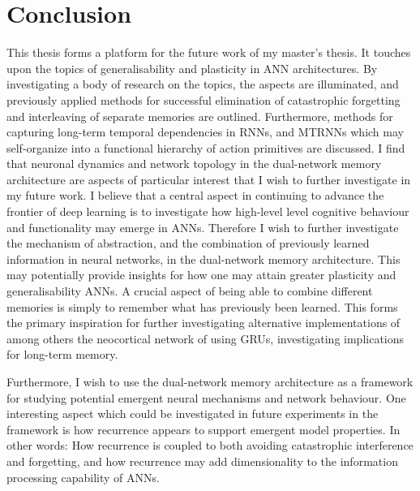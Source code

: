 \section{Conclusion}

This thesis forms a platform for the future work of my master's thesis. It touches upon the topics of generalisability and plasticity in ANN architectures. By investigating a body of research on the topics, the aspects are illuminated, and previously applied methods for successful elimination of catastrophic forgetting and interleaving of separate memories are outlined. Furthermore, methods for capturing long-term temporal dependencies in RNNs, and MTRNNs which may self-organize into a functional hierarchy of action primitives are discussed. 
I find that neuronal dynamics and network topology in the dual-network memory architecture are aspects of particular interest that I wish to further investigate in my future work. 
I believe that a central aspect in continuing to advance the frontier of deep learning is to investigate how high-level level cognitive behaviour and functionality may emerge in ANNs. Therefore I wish to further investigate the mechanism of abstraction, and the combination of previously learned information in neural networks, in the dual-network memory architecture. This may potentially provide insights for how one may attain greater plasticity and generalisability ANNs. 
A crucial aspect of being able to combine different memories is simply to remember what has previously been learned. This forms the primary inspiration for further investigating alternative implementations of among others the neocortical network of \cite{Hattori2014} using GRUs, investigating implications for long-term memory.

Furthermore, I wish to use the dual-network memory architecture as a framework for studying potential emergent neural mechanisms and network behaviour.
One interesting aspect which could be investigated in future experiments in the framework is how recurrence appears to support emergent model properties. In other words: How recurrence is coupled to both avoiding catastrophic interference and forgetting, and how recurrence may add dimensionality to the information processing capability of ANNs.

\cleardoublepage